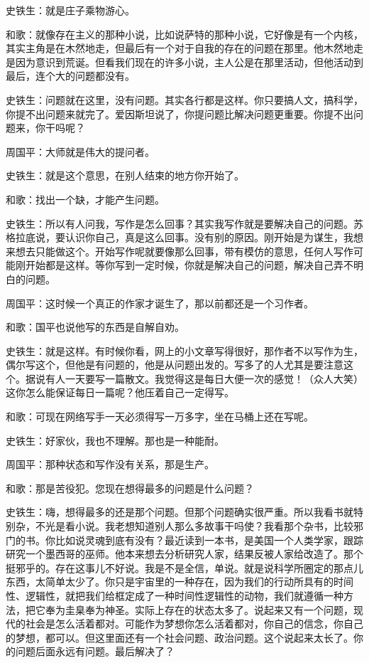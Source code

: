 \documentclass[fontset=fandol,12pt,a5paper]{ctexbook}
\begin{document}
史铁生：就是庄子乘物游心。

和歌：就像存在主义的那种小说，比如说萨特的那种小说，它好像是有一个内核，其实主角是在木然地走，但最后有一个对于自我的存在的问题在那里。他木然地走是因为意识到荒诞。但看我们现在的许多小说，主人公是在那里活动，但他活动到最后，连个大的问题都没有。

史铁生：问题就在这里，没有问题。其实各行都是这样。你只要搞人文，搞科学，你提不出问题来就完了。爱因斯坦说了，你提问题比解决问题更重要。你提不出问题来，你干吗呢？

周国平：大师就是伟大的提问者。

史铁生：就是这个意思，在别人结束的地方你开始了。

和歌：找出一个缺，才能产生问题。

史铁生：所以有人问我，写作是怎么回事？其实我写作就是要解决自己的问题。苏格拉底说，要认识你自己，真是这么回事。没有别的原因。刚开始是为谋生，我想来想去只能做这个。开始写作呢就要像那么回事，带有模仿的意思，任何人写作可能刚开始都是这样。等你写到一定时候，你就是解决自己的问题，解决自己弄不明白的问题。

周国平：这时候一个真正的作家才诞生了，那以前都还是一个习作者。

和歌：国平也说他写的东西是自解自劝。

史铁生：就是这样。有时候你看，网上的小文章写得很好，那作者不以写作为生，偶尔写这个，但他是有问题的，他是从问题出发的。写多了的人尤其是要注意这个。据说有人一天要写一篇散文。我觉得这是每日大便一次的感觉！（众人大笑）这你怎么能保证每日一篇呢？他压着自己一定得写。

和歌：可现在网络写手一天必须得写一万多字，坐在马桶上还在写呢。

史铁生：好家伙，我也不理解。那也是一种能耐。

周国平：那种状态和写作没有关系，那是生产。

和歌：那是苦役犯。您现在想得最多的问题是什么问题？

史铁生：嗨，想得最多的还是那个问题。但那个问题确实很严重。所以我看书就特别杂，不光是看小说。我老想知道别人那么多故事干吗使？我看那个杂书，比较邪门的书。你比如说灵魂到底有没有？最近读到一本书，是美国一个人类学家，跟踪研究一个墨西哥的巫师。他本来想去分析研究人家，结果反被人家给改造了。那个挺邪乎的。存在这事儿不好说。我是不是全信，单说。就是说科学所圈定的那点儿东西，太简单太少了。你只是宇宙里的一种存在，因为我们的行动所具有的时间性、逻辑性，就把我们给框定成了一种时间性逻辑性的动物，我们就遵循一种方法，把它奉为圭臬奉为神圣。实际上存在的状态太多了。说起来又有一个问题，现代的社会是怎么活着都对。可能作为梦想你怎么活着都对，你自己的信念，你自己的梦想，都可以。但这里面还有一个社会问题、政治问题。这个说起来太长了。你的问题后面永远有问题。最后解决了？
\end{document}
